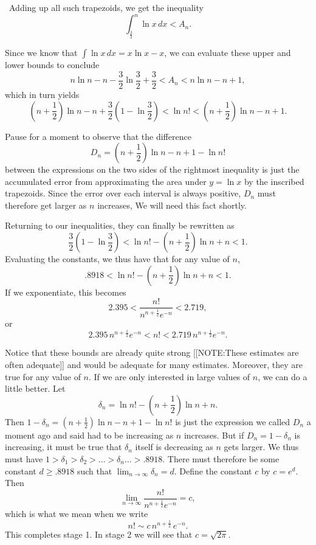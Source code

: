 \quad \ Adding up all such trapezoids, we get the inequality
\[
\int_{\frac{3}{2}}^n\ln x\,dx <A_n.
\] 




Since we know that $\int \ln x\,dx = x\ln x -x$, we can evaluate these
upper and lower bounds to conclude
\[
n\ln n-n-\dfrac{3}{2}\ln \dfrac{3}{2} + \dfrac{3}{2} <A_n<n\ln n -n +1,
\]
which in turn yields
\[
\left(n+\dfrac{1}{2}\right)\ln n-n+\dfrac{3}{2}\left(1-\ln \dfrac{3}{2}\right) <\ln n!<\left(n+\dfrac{1}{2}\right)\ln n -n +1.
\]

Pause for a moment to observe that the difference
\[
D_n = \left(n+ \dfrac{1}{2}\right)\ln n -n +1-\ln n!
\] 
between the expressions on the two sides of the rightmost
inequality is just the accumulated error from approximating the area
under $y=\ln x$ by the inscribed trapezoids. Since the error over each
interval is always positive, $D_n$ must therefore get larger as $n$
increases, We will need this fact shortly.

Returning to our inequalities, they can finally be rewritten as
\[
\dfrac{3}{2}\left(1-\ln \dfrac{3}{2}\right) 
 < \ln n!-\left(n+ \dfrac{1}{2}\right)\ln n +n <1.
\]
Evaluating the constants, we thus have that for any value of $n$,
\[
.8918<\ln n!-\left(n+\dfrac{1}{2}\right)\ln n +n <1.
\]
If we exponentiate, this becomes
\[
2.395<\dfrac{n!}{n^{n+\frac{1}{2}}e^{-n}} <2.719,
\]
or
\[
2.395 \, n^{n+\frac{1}{2}}e^{-n} 
   < n! < 2.719 \, n^{n+\frac{1}{2}}e^{-n}.
\]

Notice that these bounds are already quite strong 
[[NOTE:These estimates  are often adequate]]	
and would be adequate for many estimates.  Moreover, they are true for
any value of $n$.  If we are only interested in large values of $n$,
we can do a little better.  Let
\[
\delta_n=\ln n!-\left(n+\dfrac{1}{2}\right)\ln n +n.
\] 
Then $1-\delta_n=(n+\frac{1}{2})\ln n -n +1-\ln n!$ is just the
expression we called $D_n$ a moment ago and said had to be increasing
as $n$ increases.  But if $D_n=1-\delta_n$ is increasing, it must be
true that $\delta_n$ itself is decreasing as $n$ gets larger.  We thus
must have $1>\delta_1>\delta_2>\ldots >\delta_n \ldots >.8918$.  There
must therefore be some constant $d\geq .8918$ such that
$\lim_{n\rightarrow \infty}\delta_n=d$. Define the constant $c$ by
$c=e^d$. Then
\[
\lim_{n\rightarrow \infty}\dfrac{n!}{n^{n+\frac{1}{2}}e^{-n}} = c,
\]
which is what we mean when we write
\[
n!\sim c\,n^{n+ \frac{1}{2}}\,e^{-n}.
\]
This completes stage 1.  In stage 2 we will see that $c=\sqrt{2\pi}$.



